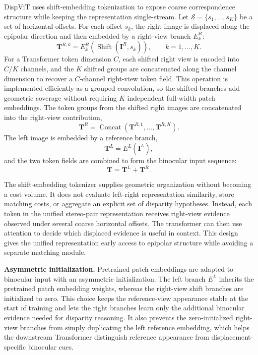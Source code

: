 DispViT uses shift-embedding tokenization to expose coarse correspondence structure while keeping the representation single-stream.
Let $\mathcal{S}=\{s_1,\ldots,s_K\}$ be a set of horizontal offsets.
For each offset $s_k$, the right image is displaced along the epipolar direction and then embedded by a right-view branch $E^R_k$:
\begin{equation}
    \bm{T}^{R,k} = E^R_k\!\left(\operatorname{Shift}(\bm{I}^R,s_k)\right),
    \qquad k=1,\ldots,K .
    \label{eq:dispvit_shift_groups}
\end{equation}
For a Transformer token dimension $C$, each shifted right view is encoded into $C/K$ channels, and the $K$ shifted groups are concatenated along the channel dimension to recover a $C$-channel right-view token field.
This operation is implemented efficiently as a grouped convolution, so the shifted branches add geometric coverage without requiring $K$ independent full-width patch embeddings.
The token groups from the shifted right images are concatenated into the right-view contribution,
\begin{equation}
    \bm{T}^R = \operatorname{Concat}\!\left(\bm{T}^{R,1},\ldots,\bm{T}^{R,K}\right).
\end{equation}
The left image is embedded by a reference branch,
\begin{equation}
    \bm{T}^L = E^L(\bm{I}^L),
\end{equation}
and the two token fields are combined to form the binocular input sequence:
\begin{equation}
    \bm{T} = \bm{T}^L + \bm{T}^R .
    \label{eq:dispvit_token_blend}
\end{equation}

The shift-embedding tokenizer supplies geometric organization without becoming a cost volume.
It does not evaluate left-right representation similarity, store matching costs, or aggregate an explicit set of disparity hypotheses.
Instead, each token in the unified stereo-pair representation receives right-view evidence observed under several coarse horizontal offsets.
The transformer can then use attention to decide which displaced evidence is useful in context.
This design gives the unified representation early access to epipolar structure while avoiding a separate matching module.

\noindent\textbf{Asymmetric initialization.}
Pretrained patch embeddings are adapted to binocular input with an asymmetric initialization.
The left branch $E^L$ inherits the pretrained patch embedding weights, whereas the right-view shift branches are initialized to zero.
This choice keeps the reference-view appearance stable at the start of training and lets the right branches learn only the additional binocular evidence needed for disparity reasoning.
It also prevents the zero-initialized right-view branches from simply duplicating the left reference embedding, which helps the downstream Transformer distinguish reference appearance from displacement-specific binocular cues.

